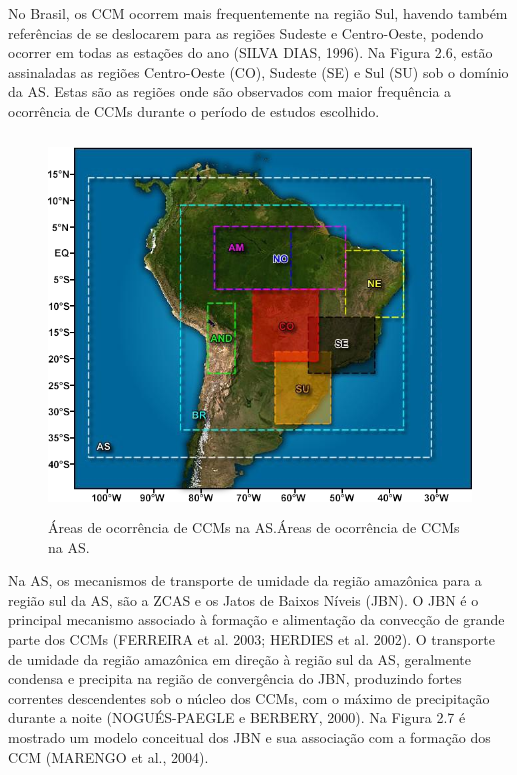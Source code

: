 No Brasil, os CCM ocorrem mais frequentemente na região Sul, havendo também referências de se deslocarem para as regiões Sudeste e Centro-Oeste, podendo ocorrer em todas as estações do ano (SILVA DIAS, 1996). Na Figura 2.6, estão assinaladas as regiões Centro-Oeste (CO), Sudeste (SE) e Sul (SU) sob o domínio da AS. Estas são as regiões onde são observados com maior frequência a ocorrência de CCMs durante o período de estudos escolhido.

\begin{figure}
\centering
\includegraphics[height=10cm]{./figs/fig09.png}
\caption{Áreas de ocorrência de CCMs na AS.Áreas de ocorrência de CCMs na AS.}
\label{fig09}
\end{figure}

Na AS, os mecanismos de transporte de umidade da região amazônica para a região sul da AS, são a ZCAS e os Jatos de Baixos Níveis (JBN). O JBN é o principal mecanismo associado à formação e alimentação da convecção de grande parte dos CCMs (FERREIRA et al. 2003; HERDIES et al. 2002). O transporte de umidade da região amazônica em direção à região sul da AS, geralmente condensa e precipita na região de convergência do JBN, produzindo fortes correntes descendentes sob o núcleo dos CCMs, com o máximo de precipitação durante a noite (NOGUÉS-PAEGLE e BERBERY, 2000). Na Figura 2.7 é mostrado um modelo conceitual dos JBN e sua associação com a formação dos CCM (MARENGO et al., 2004).

